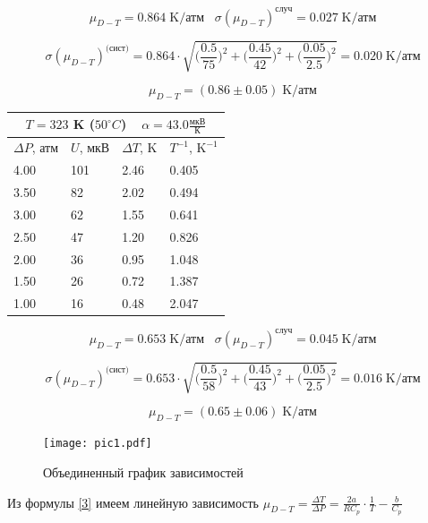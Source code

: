 \documentclass[a4paper, 12pt]{article}
\begin{document}
	$$ \mu_{D-T} = 0.864 \; \text{K/атм} \;\;\; \sigma(\mu_{D-T})^{\text{случ}} = 0.027 \; \text{K/атм} $$
	
	$$ \sigma(\mu_{D-T})^{ \text{(сист)} } = 0.864 \cdot \sqrt{
		\Big(\frac{0.5}{75}\Big)^2 + 
		\Big(\frac{0.45}{42}\Big)^2 + 
		\Big(\frac{0.05}{2.5}\Big)^2
	} = 0.020 \; \text{K/атм} $$

	\begin{equation*}
		\mu_{D-T} = (0.86 \pm 0.05) \; \text{K/атм}
	\end{equation*}
	
	\begin{table}[H]
		\centering
		\begin{tabular}{llll}
			\hline
			\multicolumn{4}{c}{$T=323$ K ($50^\circ C$) $ \;\;\; \alpha = 43.0 \frac{\text{мкВ}}{\text{К}} $} \\
			\hline
			$\Delta P$, атм & $U$, мкВ & $\Delta T$, K & $T^{-1}$, $\text{K}^{-1}$ \\ \hline
			4.00 & 101 & 2.46 & 0.405 \\
			3.50 & 82  & 2.02 & 0.494 \\
			3.00 & 62  & 1.55 & 0.641 \\
			2.50 & 47  & 1.20 & 0.826 \\
			2.00 & 36  & 0.95 & 1.048 \\
			1.50 & 26  & 0.72 & 1.387 \\
			1.00 & 16  & 0.48 & 2.047 \\				\hline
		\end{tabular}
	\end{table}

	$$ \mu_{D-T} = 0.653 \; \text{K/атм} \;\;\; \sigma(\mu_{D-T})^{\text{случ}} = 0.045 \; \text{K/атм} $$
	
	$$ \sigma(\mu_{D-T})^{ \text{(сист)} } = 0.653 \cdot \sqrt{
		\Big(\frac{0.5}{58}\Big)^2 + 
		\Big(\frac{0.45}{43}\Big)^2 + 
		\Big(\frac{0.05}{2.5}\Big)^2
	} = 0.016 \; \text{K/атм} $$
	
	\begin{equation*}
		\mu_{D-T} = (0.65 \pm 0.06) \; \text{K/атм}
	\end{equation*}
	
	\begin{figure}[H]
		\centering
		\texttt{[image: pic1.pdf]}
		\caption{Объединенный график зависимостей}
	\end{figure}

	Из формулы \eqref{3} имеем линейную зависимость $\mu_{D-T}=\frac{\Delta T}{\Delta P} = \frac{2a}{RC_p} \cdot \frac{1}{T} - \frac{b}{C_p}$
	
\end{document}
